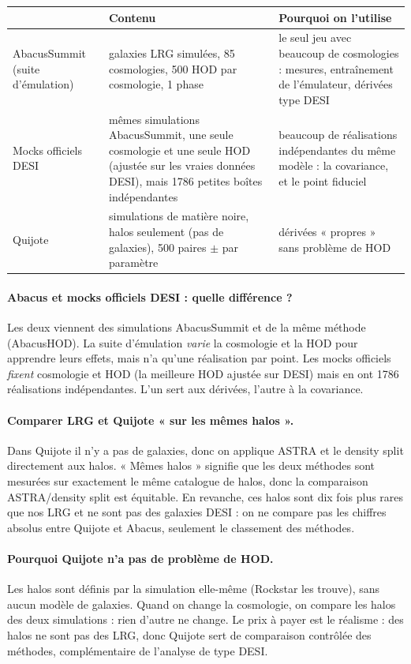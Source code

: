 \documentclass[11pt]{article}
\begin{document}
\begin{center}\small
\begin{tabular}{p{3.2cm}p{4.8cm}p{6.5cm}}
\toprule
 & Contenu & Pourquoi on l'utilise \\
\midrule
AbacusSummit (suite d'émulation) & galaxies LRG simulées, 85 cosmologies, 500 HOD par cosmologie, 1 phase & le seul jeu avec beaucoup de cosmologies : mesures, entraînement de l'émulateur, dérivées type DESI \\
Mocks officiels DESI & mêmes simulations AbacusSummit, une seule cosmologie et une seule HOD (ajustée sur les vraies données DESI), mais 1786 petites boîtes indépendantes & beaucoup de réalisations indépendantes du même modèle : la covariance, et le point fiduciel \\
Quijote & simulations de matière noire, halos seulement (pas de galaxies), 500 paires $\pm$ par paramètre & dérivées « propres » sans problème de HOD \\
\bottomrule
\end{tabular}
\end{center}

\paragraph{Abacus et mocks officiels DESI : quelle différence ?} Les deux viennent des simulations AbacusSummit et de la même méthode (AbacusHOD). La suite d'émulation \emph{varie} la cosmologie et la HOD pour apprendre leurs effets, mais n'a qu'une réalisation par point. Les mocks officiels \emph{fixent} cosmologie et HOD (la meilleure HOD ajustée sur DESI) mais en ont 1786 réalisations indépendantes. L'un sert aux dérivées, l'autre à la covariance.

\paragraph{Comparer LRG et Quijote « sur les mêmes halos ».} Dans Quijote il n'y a pas de galaxies, donc on applique ASTRA et le density split directement aux halos. « Mêmes halos » signifie que les deux méthodes sont mesurées sur exactement le même catalogue de halos, donc la comparaison ASTRA/density split est équitable. En revanche, ces halos sont dix fois plus rares que nos LRG et ne sont pas des galaxies DESI : on ne compare pas les chiffres absolus entre Quijote et Abacus, seulement le classement des méthodes.

\paragraph{Pourquoi Quijote n'a pas de problème de HOD.} Les halos sont définis par la simulation elle-même (Rockstar les trouve), sans aucun modèle de galaxies. Quand on change la cosmologie, on compare les halos des deux simulations : rien d'autre ne change. Le prix à payer est le réalisme : des halos ne sont pas des LRG, donc Quijote sert de comparaison contrôlée des méthodes, complémentaire de l'analyse de type DESI.
\end{document}
